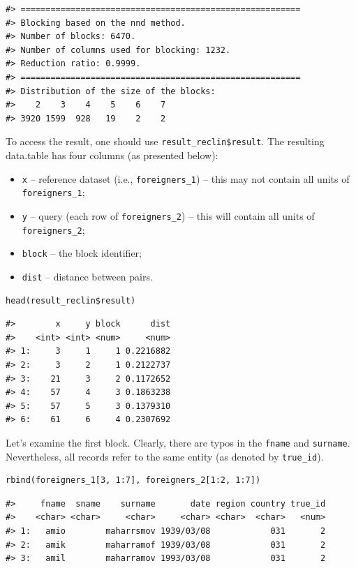 \begin{verbatim}
#> ========================================================
#> Blocking based on the nnd method.
#> Number of blocks: 6470.
#> Number of columns used for blocking: 1232.
#> Reduction ratio: 0.9999.
#> ========================================================
#> Distribution of the size of the blocks:
#>    2    3    4    5    6    7 
#> 3920 1599  928   19    2    2
\end{verbatim}

To access the result, one should use \texttt{result\_reclin\$result}. The
resulting data.table has four columns (as presented below):

\begin{itemize}
\tightlist
\item
  \texttt{x} -- reference dataset (i.e., \texttt{foreigners\_1}) -- this may not
  contain all units of \texttt{foreigners\_1};
\item
  \texttt{y} -- query (each row of \texttt{foreigners\_2}) -- this will contain all
  units of \texttt{foreigners\_2};
\item
  \texttt{block} -- the block identifier;
\item
  \texttt{dist} -- distance between pairs.
\end{itemize}

\begin{verbatim}
head(result_reclin$result)
\end{verbatim}

\begin{verbatim}
#>        x     y block      dist
#>    <int> <int> <num>     <num>
#> 1:     3     1     1 0.2216882
#> 2:     3     2     1 0.2122737
#> 3:    21     3     2 0.1172652
#> 4:    57     4     3 0.1863238
#> 5:    57     5     3 0.1379310
#> 6:    61     6     4 0.2307692
\end{verbatim}

Let's examine the first block. Clearly, there are typos in the \texttt{fname}
and \texttt{surname}. Nevertheless, all records refer to the same entity (as
denoted by \texttt{true\_id}).

\begin{verbatim}
rbind(foreigners_1[3, 1:7], foreigners_2[1:2, 1:7])
\end{verbatim}

\begin{verbatim}
#>     fname  sname    surname       date region country true_id
#>    <char> <char>     <char>     <char> <char>  <char>   <num>
#> 1:   amio        maharrsmov 1939/03/08            031       2
#> 2:   amik        maharramof 1939/03/08            031       2
#> 3:   amil        maharramov 1993/03/08            031       2
\end{verbatim}


